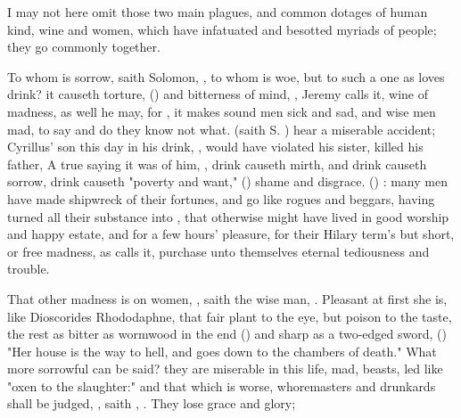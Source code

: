 I may not here omit those two main plagues, and common dotages of human kind,
wine and women, which have infatuated and besotted myriads of people; they go
commonly together.


To whom is sorrow, saith Solomon, , to whom is
woe, but to such a one as loves drink? it causeth torture, () and bitterness of mind,  ,
Jeremy calls it,  wine of madness, as well he
may, for , it makes sound men sick and sad, and wise
men mad, to say and do they know not what.  (saith S. \Austin{}) hear a miserable
accident; Cyrillus' son this day in his drink, , would have violated his sister, killed his father,
\etc{} A true saying it was of him, , drink
causeth mirth, and drink causeth sorrow, drink causeth "poverty and want,"
() shame and disgrace.  (\Austin{}) : many men
have made shipwreck of their fortunes, and go like rogues and beggars, having
turned all their substance into , that otherwise might have
lived in good worship and happy estate, and for a few hours' pleasure, for
their Hilary term's but short, or free madness, as \Seneca{}
calls it, purchase unto themselves eternal tediousness and trouble.

That other madness is on women, , saith the wise man,
. Pleasant at first she
is, like Dioscorides Rhododaphne, that fair plant to the eye, but poison to the
taste, the rest as bitter as wormwood in the end ()
and sharp as a two-edged sword, () "Her house is the way to
hell, and goes down to the chambers of death." What more sorrowful can be said?
they are miserable in this life, mad, beasts, led like
"oxen to the slaughter:" and that which is worse,
whoremasters and drunkards shall be judged, , saith
\Austin{}, . They lose grace
and glory;

